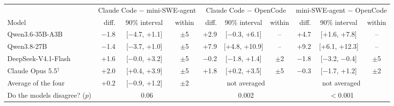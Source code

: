\footnotesize\setlength{\tabcolsep}{3.2pt}
\begin{tabular}{@{}l rcc rcc rcc@{}}
\toprule
 & \multicolumn{3}{c}{Claude Code $-$ mini-SWE-agent} & \multicolumn{3}{c}{Claude Code $-$ OpenCode} & \multicolumn{3}{c}{mini-SWE-agent $-$ OpenCode} \\
\cmidrule(lr){2-4}\cmidrule(lr){5-7}\cmidrule(l){8-10}
Model & diff. & 90\% interval & within & diff. & 90\% interval & within & diff. & 90\% interval & within \\
\midrule
Qwen3.6-35B-A3B & $-$1.8 & [$-$4.7, +1.1] & $\pm$5 & +2.9 & [$-$0.3, +6.1] & -- & +4.7 & [+1.6, +7.8] & -- \\
Qwen3.8-27B & $-$1.4 & [$-$3.7, +1.0] & $\pm$5 & +7.9 & [+4.8, +10.9] & -- & +9.2 & [+6.1, +12.3] & -- \\
DeepSeek-V4.1-Flash & +1.6 & [$-$0.0, +3.2] & $\pm$5 & $-$0.2 & [$-$1.8, +1.4] & $\pm$2 & $-$1.8 & [$-$3.2, $-$0.4] & $\pm$5 \\
Claude Opus 5.5$^{\dagger}$ & +2.0 & [+0.4, +3.9] & $\pm$5 & +1.8 & [+0.2, +3.5] & $\pm$5 & $-$0.3 & [$-$1.7, +1.2] & $\pm$2 \\
\midrule
Average of the four & +0.2 & [$-$0.9, +1.2] & $\pm$2 & \multicolumn{3}{c}{not averaged} & \multicolumn{3}{c}{not averaged} \\
Do the models disagree? ($p$) & \multicolumn{3}{c}{0.06} & \multicolumn{3}{c}{0.002} & \multicolumn{3}{c}{$<$0.001} \\
\bottomrule
\end{tabular}
